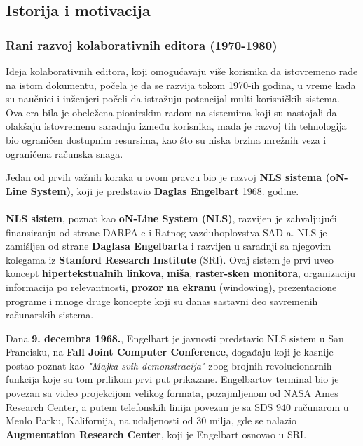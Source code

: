 \documentclass[12pt]{article}
\begin{document}
\subsection{Istorija i motivacija}
   

\subsubsection{Rani razvoj kolaborativnih editora (1970-1980)}

Ideja kolaborativnih editora, koji omogućavaju više korisnika da istovremeno rade na istom dokumentu, počela je da se razvija tokom 1970-ih godina, u vreme kada su naučnici i inženjeri počeli da istražuju potencijal multi-korisničkih sistema. Ova era bila je obeležena pionirskim radom na sistemima koji su nastojali da olakšaju istovremenu saradnju između korisnika, mada je razvoj tih tehnologija bio ograničen dostupnim resursima, kao što su niska brzina mrežnih veza i ograničena računska snaga.
    
Jedan od prvih važnih koraka u ovom pravcu bio je razvoj \textbf{NLS sistema (oN-Line System)}, koji je predstavio \textbf{Daglas Engelbart} 1968. godine.

\paragraph{}
\textbf{NLS sistem}, poznat kao \textbf{oN-Line System (NLS)}, razvijen je zahvaljujući finansiranju od strane DARPA-e i Ratnog vazduhoplovstva SAD-a. NLS je zamišljen od strane \textbf{Daglasa Engelbarta} i razvijen u saradnji sa njegovim kolegama iz \textbf{Stanford Research Institute} (SRI). Ovaj sistem je prvi uveo koncept \textbf{hipertekstualnih linkova}, \textbf{miša}, \textbf{raster-sken monitora}, organizaciju informacija po relevantnosti, \textbf{prozor na ekranu} (windowing), prezentacione programe i mnoge druge koncepte koji su danas sastavni deo savremenih računarskih sistema. \cite{gerritsen1992}
    
Dana \textbf{9. decembra 1968.}, Engelbart je javnosti predstavio NLS sistem u San Francisku, na \textbf{Fall Joint Computer Conference}, događaju koji je kasnije postao poznat kao \textit{"Majka svih demonstracija"} zbog brojnih revolucionarnih funkcija koje su tom prilikom prvi put prikazane. Engelbartov terminal bio je povezan sa video projekcijom velikog formata, pozajmljenom od NASA Ames Research Center, a putem telefonskih linija povezan je sa SDS 940 računarom u Menlo Parku, Kalifornija, na udaljenosti od 30 milja, gde se nalazio \textbf{Augmentation Research Center}, koji je Engelbart osnovao u SRI.
    
\end{document}
